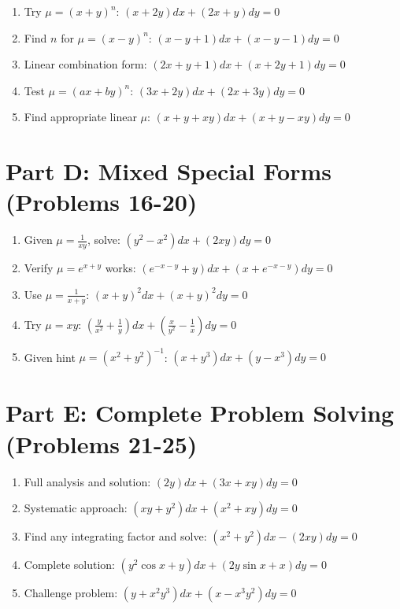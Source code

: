 \documentclass[12pt]{article}
\begin{document}
\begin{enumerate}[start=11]
\item Try $\mu = (x + y)^n$: $(x + 2y)dx + (2x + y)dy = 0$

\item Find $n$ for $\mu = (x - y)^n$: $(x - y + 1)dx + (x - y - 1)dy = 0$

\item Linear combination form: $(2x + y + 1)dx + (x + 2y + 1)dy = 0$

\item Test $\mu = (ax + by)^n$: $(3x + 2y)dx + (2x + 3y)dy = 0$

\item Find appropriate linear $\mu$: $(x + y + xy)dx + (x + y - xy)dy = 0$
\end{enumerate}

\section*{Part D: Mixed Special Forms (Problems 16-20)}

\begin{enumerate}[start=16]
\item Given $\mu = \frac{1}{xy}$, solve: $(y^2 - x^2)dx + (2xy)dy = 0$

\item Verify $\mu = e^{x+y}$ works: $(e^{-x-y} + y)dx + (x + e^{-x-y})dy = 0$

\item Use $\mu = \frac{1}{x+y}$: $(x+y)^2dx + (x+y)^2dy = 0$

\item Try $\mu = xy$: $\left(\frac{y}{x^2} + \frac{1}{y}\right)dx + \left(\frac{x}{y^2} - \frac{1}{x}\right)dy = 0$

\item Given hint $\mu = (x^2 + y^2)^{-1}$: $(x + y^3)dx + (y - x^3)dy = 0$
\end{enumerate}

\section*{Part E: Complete Problem Solving (Problems 21-25)}

\begin{enumerate}[start=21]
\item Full analysis and solution: $(2y)dx + (3x + xy)dy = 0$

\item Systematic approach: $(xy + y^2)dx + (x^2 + xy)dy = 0$

\item Find any integrating factor and solve: $(x^2 + y^2)dx - (2xy)dy = 0$

\item Complete solution: $(y^2\cos x + y)dx + (2y\sin x + x)dy = 0$

\item Challenge problem: $(y + x^2y^3)dx + (x - x^3y^2)dy = 0$
\end{enumerate}
\end{document}
